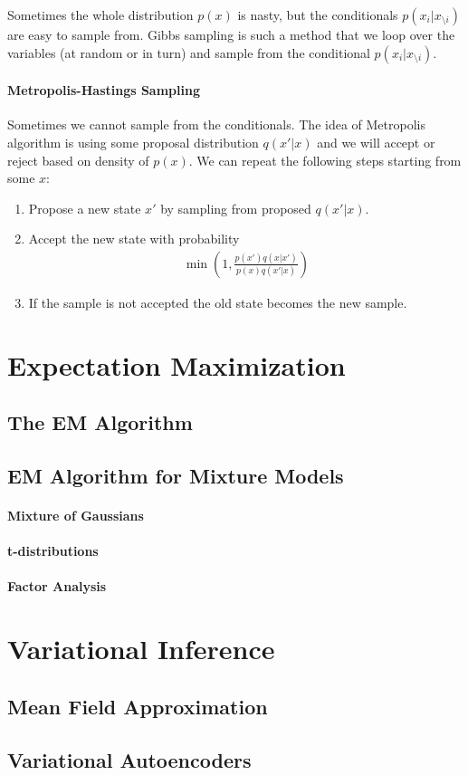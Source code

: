 Sometimes the whole distribution $p(x)$ is nasty, but the conditionals $p(x_i|x_{\setminus i})$ are easy to sample from. Gibbs sampling is such a method that we loop over the variables (at random or in turn) and sample from the conditional $p(x_i|x_{\setminus i})$.

\paragraph{Metropolis-Hastings Sampling}

Sometimes we cannot sample from the conditionals. The idea of Metropolis algorithm is using some proposal distribution $q(x'|x)$ and we will accept or reject based on density of $p(x)$. We can repeat the following steps starting from some $x$:
\begin{enumerate}
	\item Propose a new state $x'$ by sampling from proposed $q(x'|x)$.
	\item Accept the new state with probability
	\begin{align*}
	\min\left(1,\frac{p(x')q(x|x')}{p(x)q(x'|x)}\right)
	\end{align*}
	\item If the sample is not accepted the old state becomes the new sample.
\end{enumerate}



\section{Expectation Maximization}

\subsection{The EM Algorithm}

\subsection{EM Algorithm for Mixture Models}

\paragraph{Mixture of Gaussians}

\paragraph{t-distributions}

\paragraph{Factor Analysis}



\section{Variational Inference}

\subsection{Mean Field Approximation}

\subsection{Variational Autoencoders}
